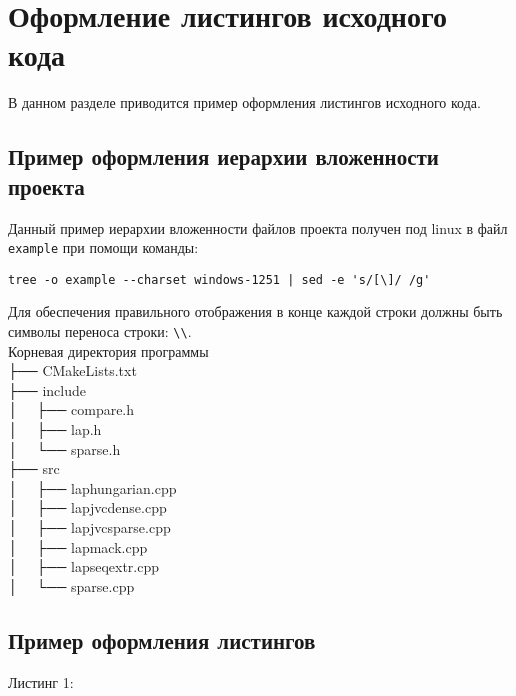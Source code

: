 \newpage\section{Оформление листингов исходного кода}

В данном разделе приводится пример оформления листингов исходного кода.

\subsection{Пример оформления иерархии вложенности проекта}

Данный пример иерархии вложенности файлов проекта получен под linux в файл \lstinline|example| при помощи команды:

\begin{lstlisting}[numbers=none]
tree -o example --charset windows-1251 | sed -e 's/[\]/ /g'
\end{lstlisting}

Для обеспечения правильного отображения в конце каждой строки должны быть символы переноса строки: \lstinline|\\|.\\

{
\listingtextsize\noindent
Корневая директория программы\\
├── CMakeLists.txt\\
├── include\\
│   ├── compare.h\\
│   ├── lap.h\\
│   └── sparse.h\\
├── src\\
│   ├── laphungarian.cpp\\
│   ├── lapjvcdense.cpp\\
│   ├── lapjvcsparse.cpp\\
│   ├── lapmack.cpp\\
│   ├── lapseqextr.cpp\\
│   └── sparse.cpp\\

}

\subsection{Пример оформления листингов}

Листинг 1:

